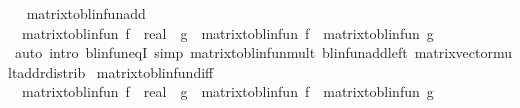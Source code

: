 \begin{isabellebody}
\endisatagproof
{\isafoldproof}%
%
\isadelimproof
\ \isanewline
%
\endisadelimproof
\isanewline
{}\isamarkupfalse%
\ matrix{\isacharunderscore}{\kern0pt}to{\isacharunderscore}{\kern0pt}blinfun{\isacharunderscore}{\kern0pt}add{\isacharcolon}{\kern0pt}\ \isanewline
\ \ {\isachardoublequoteopen}matrix{\isacharunderscore}{\kern0pt}to{\isacharunderscore}{\kern0pt}blinfun\ {\isacharparenleft}{\kern0pt}{\isacharparenleft}{\kern0pt}f\ {\isacharcolon}{\kern0pt}{\isacharcolon}{\kern0pt}\ real{\isacharcircum}{\kern0pt}{\isacharunderscore}{\kern0pt}{\isacharcircum}{\kern0pt}{\isacharunderscore}{\kern0pt}{\isacharparenright}{\kern0pt}\ {\isacharplus}{\kern0pt}\ g{\isacharparenright}{\kern0pt}\ {\isacharequal}{\kern0pt}\ matrix{\isacharunderscore}{\kern0pt}to{\isacharunderscore}{\kern0pt}blinfun\ f\ {\isacharplus}{\kern0pt}\ matrix{\isacharunderscore}{\kern0pt}to{\isacharunderscore}{\kern0pt}blinfun\ g{\isachardoublequoteclose}\isanewline
%
\isadelimproof
\ \ %
\endisadelimproof
%
\isatagproof
{}\isamarkupfalse%
\ {\isacharparenleft}{\kern0pt}auto\ intro{\isacharbang}{\kern0pt}{\isacharcolon}{\kern0pt}\ blinfun{\isacharunderscore}{\kern0pt}eqI\ simp{\isacharcolon}{\kern0pt}\ matrix{\isacharunderscore}{\kern0pt}to{\isacharunderscore}{\kern0pt}blinfun{\isacharunderscore}{\kern0pt}mult\ blinfun{\isachardot}{\kern0pt}add{\isacharunderscore}{\kern0pt}left\ matrix{\isacharunderscore}{\kern0pt}vector{\isacharunderscore}{\kern0pt}mult{\isacharunderscore}{\kern0pt}add{\isacharunderscore}{\kern0pt}rdistrib{\isacharparenright}{\kern0pt}%
\endisatagproof
{\isafoldproof}%
%
\isadelimproof
\isanewline
%
\endisadelimproof
\isanewline
{}\isamarkupfalse%
\ matrix{\isacharunderscore}{\kern0pt}to{\isacharunderscore}{\kern0pt}blinfun{\isacharunderscore}{\kern0pt}diff{\isacharcolon}{\kern0pt}\ \isanewline
\ \ {\isachardoublequoteopen}matrix{\isacharunderscore}{\kern0pt}to{\isacharunderscore}{\kern0pt}blinfun\ {\isacharparenleft}{\kern0pt}{\isacharparenleft}{\kern0pt}f\ {\isacharcolon}{\kern0pt}{\isacharcolon}{\kern0pt}\ real{\isacharcircum}{\kern0pt}{\isacharunderscore}{\kern0pt}{\isacharcircum}{\kern0pt}{\isacharunderscore}{\kern0pt}{\isacharparenright}{\kern0pt}\ {\isacharminus}{\kern0pt}\ g{\isacharparenright}{\kern0pt}\ {\isacharequal}{\kern0pt}\ matrix{\isacharunderscore}{\kern0pt}to{\isacharunderscore}{\kern0pt}blinfun\ f\ {\isacharminus}{\kern0pt}\ matrix{\isacharunderscore}{\kern0pt}to{\isacharunderscore}{\kern0pt}blinfun\ g{\isachardoublequoteclose}\isanewline
%
\isadelimproof
\ \ %
\endisadelimproof
%
\isatagproof
{}\isamarkupfalse%

\end{isabellebody}
